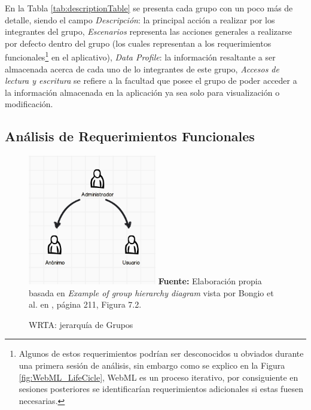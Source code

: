 \documentclass[oneside,12pt,a4paper]{memoir}%
\begin{document}
		
		En la Tabla \ref{tab:descriptionTable} se presenta cada grupo con un poco
		m\'as de detalle, siendo el campo \textit{Descripci\'on}: la principal
		acci\'on a realizar por los integrantes del grupo, \textit{Escenarios}
	    representa las acciones generales a realizarse por defecto dentro del
	    grupo (los cuales representan a los requerimientos
	    funcionales\footnote{Algunos de estos requerimientos podr\'ian ser
	    desconocidos u obviados durante una primera sesi\'on de an\'alisis, sin
	    embargo como se explico en la Figura \ref{fig:WebML_LifeCicle},
	    \ac{WebML} es un proceso iterativo, por consiguiente en sesiones
	    posteriores se identificar\'ian requerimientos adicionales si estas fuesen
	    necesarias.} en el aplicativo), \textit{Data Profile}: la informaci\'on
	    resaltante a ser almacenada acerca de cada uno de lo integrantes de este grupo,
	    \textit{Accesos de lectura y escritura} se refiere a la facultad que posee
	    el grupo de poder acceder a la informaci\'on almacenada en la aplicaci\'on
	    ya sea solo para visualizaci\'on o modificaci\'on.
	    
		\subsection{An\'alisis de Requerimientos Funcionales}
		\label{ssec:functionalReq}
		
		\begin{figure}[here]
			\centering 
			\caption{WRTA: jerarqu\'ia de Grupos}
			\includegraphics[width=0.5\textwidth]{figure/fig_WRTA_Hierarchy.png}
			\newline
			\textbf{Fuente:} Elaboraci\'on propia basada en \textit{Example of group
			hierarchy diagram} vista por Bongio et al. en \cite{Ceri2003}, p\'agina
			211, Figura 7.2.
			\label{fig:WRTA_Hierarchy} 
		\end{figure}
	    
\end{document}
